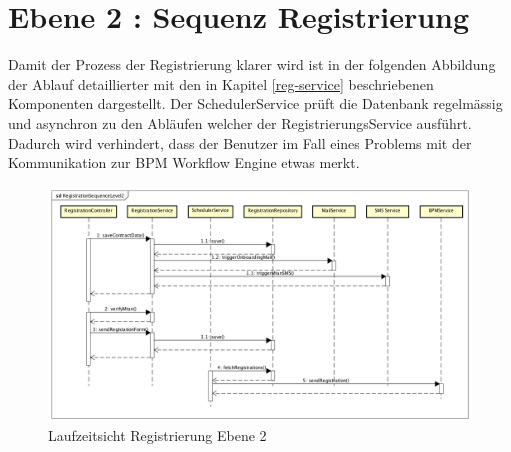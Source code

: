 \section{Ebene 2 : Sequenz Registrierung}

Damit der Prozess der Registrierung klarer wird ist in der folgenden Abbildung der Ablauf detaillierter mit den in Kapitel \ref{reg-service} beschriebenen Komponenten dargestellt. Der SchedulerService prüft die Datenbank regelmässig und asynchron zu den Abläufen welcher der RegistrierungsService ausführt. Dadurch wird verhindert, dass der Benutzer im Fall eines Problems mit der Kommunikation zur BPM Workflow Engine etwas merkt.
\begin{figure}[H]
	\centering
	\includegraphics[scale=0.42]{RegistrationSequenceLevel2.png}
	\caption{Laufzeitsicht Registrierung Ebene 2}
\end{figure}




